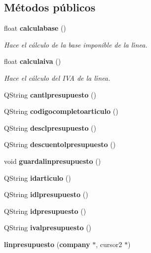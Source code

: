 \subsection*{M\'{e}todos p\'{u}blicos}
\begin{CompactItemize}
\item 
float {\bf calculabase} ()\label{classlinpresupuesto_a0}

\begin{CompactList}\small\item\em Hace el c\'{a}lculo de la base imponible de la l\'{\i}nea. \item\end{CompactList}\item 
float {\bf calculaiva} ()\label{classlinpresupuesto_a1}

\begin{CompactList}\small\item\em Hace el c\'{a}lculo del IVA de la l\'{\i}nea. \item\end{CompactList}\item 
QString {\bf cantlpresupuesto} ()\label{classlinpresupuesto_a2}

\item 
QString {\bf codigocompletoarticulo} ()\label{classlinpresupuesto_a3}

\item 
QString {\bf desclpresupuesto} ()\label{classlinpresupuesto_a4}

\item 
QString {\bf descuentolpresupuesto} ()\label{classlinpresupuesto_a5}

\item 
void {\bf guardalinpresupuesto} ()\label{classlinpresupuesto_a6}

\item 
QString {\bf idarticulo} ()\label{classlinpresupuesto_a7}

\item 
QString {\bf idlpresupuesto} ()\label{classlinpresupuesto_a8}

\item 
QString {\bf idpresupuesto} ()\label{classlinpresupuesto_a9}

\item 
QString {\bf ivalpresupuesto} ()\label{classlinpresupuesto_a10}

\item 
{\bf linpresupuesto} ({\bf company} $\ast$, cursor2 $\ast$)\label{classlinpresupuesto_a11}


\end{CompactItemize}
